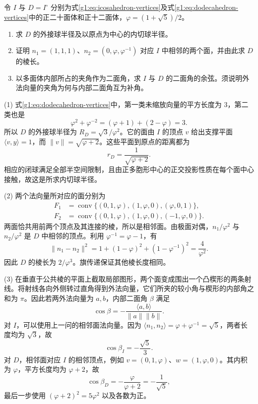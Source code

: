 \begin{exercise}
	\label{g1:ex:icosahedron-polar-metric}
	令 \(I\) 与 \(D=I^\circ\) 分别为式\eqref{g1:eq:icosahedron-vertices}及式\eqref{g1:eq:dodecahedron-vertices}中的正二十面体和正十二面体，\(\varphi=(1+\sqrt5)/2\)。
	\begin{enumerate}
		\item 求 \(D\) 的外接球半径及以原点为中心的内切球半径。
		\item 证明 \(n_1=(1,1,1)\)、\(n_2=(0,\varphi,\varphi^{-1})\) 对应 \(I\) 中相邻的两个面，并由此求 \(D\) 的棱长。
		\item 以多面体内部所占的夹角作为二面角，求 \(I\) 与 \(D\) 的二面角的余弦。须说明外法向量的夹角为何与内部二面角互为补角。
	\end{enumerate}
\end{exercise}
\begin{solution}
	(1) 式\eqref{g1:eq:dodecahedron-vertices}中，第一类未缩放向量的平方长度为 \(3\)，第二类也是
	\[
		\varphi^2+\varphi^{-2}=(\varphi+1)+(2-\varphi)=3.
	\]
	所以 \(D\) 的外接球半径为 \(R_D=\sqrt3/\varphi^2\)。它的面由 \(I\) 的顶点 \(v\) 给出支撑平面 \(\langle v,y\rangle=1\)，而 \(\lVert v\rVert=\sqrt{\varphi+2}\)。这些平面到原点的距离都为
	\[
		r_D=\frac1{\sqrt{\varphi+2}}.
	\]
	相应的闭球满足全部半空间限制，且由正多胞形中心的正交投影性质在每个面中心接触，故这是所求内切球半径。

	(2) 两个法向量所对应的面分别为
	\begin{align*}
		F_1&=\operatorname{conv}\{(0,1,\varphi),(1,\varphi,0),(\varphi,0,1)\},\\
		F_2&=\operatorname{conv}\{(0,1,\varphi),(1,\varphi,0),(-1,\varphi,0)\}.
	\end{align*}
	两面恰共用前两个顶点及其连接的棱，所以是相邻面。由极面对偶，\(n_1/\varphi^2\) 与 \(n_2/\varphi^2\) 是 \(D\) 中相邻的顶点。利用 \(\varphi^{-1}=\varphi-1\)，有
	\[
		\lVert n_1-n_2\rVert^2
		=1+(1-\varphi)^2+(1-\varphi^{-1})^2
		=\frac4{\varphi^2}.
	\]
	因此 \(D\) 的棱长为 \(2/\varphi^3\)。旗传递保证其他棱长度相同。

	(3) 在垂直于公共棱的平面上截取局部图形，两个面变成围出一个凸楔形的两条射线。将射线各向外侧转过直角得到外法向量，它们所夹的较小角与楔形的内部角之和为 \(\pi\)。因此若两外法向量为 \(a,b\)，内部二面角 \(\beta\) 满足
	\[
		\cos\beta=-\frac{\langle a,b\rangle}{\lVert a\rVert\lVert b\rVert}.
	\]
	对 \(I\)，可以使用上一问的相邻面法向量。因为 \(\langle n_1,n_2\rangle=\varphi+\varphi^{-1}=\sqrt5\)，两者长度均为 \(\sqrt3\)，故
	\[
		\cos\beta_I=-\frac{\sqrt5}{3}.
	\]
	对 \(D\)，相邻面对应 \(I\) 的相邻顶点，例如 \(v=(0,1,\varphi)\)、\(w=(1,\varphi,0)\)。其内积为 \(\varphi\)，平方长度均为 \(\varphi+2\)，故
	\[
		\cos\beta_D=-\frac{\varphi}{\varphi+2}
		=-\frac1{\sqrt5},
	\]
	最后一步使用 \((\varphi+2)^2=5\varphi^2\) 以及各数为正。
\end{solution}

